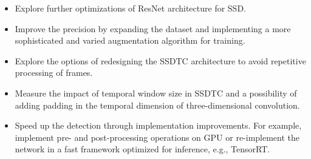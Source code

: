 \begin{itemize}
\item Explore further optimizations of ResNet architecture for SSD.

\item Improve the precision by expanding the dataset and implementing a more sophisticated and varied augmentation algorithm for training.

\item Explore the options of redesigning the SSDTC architecture to avoid repetitive processing of frames. 

\item Measure the impact of temporal window size in SSDTC and a possibility of adding padding in the temporal dimension of three-dimensional convolution.

\item Speed up the detection through implementation improvements. For example, implement pre- and post-processing operations on GPU or re-implement the network in a fast framework optimized for inference, e.g., TensorRT.
\end{itemize}



